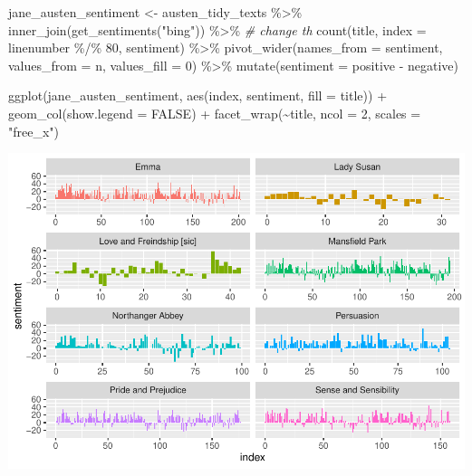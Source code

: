 \documentclass[
]{article}
\newenvironment{Shaded}{\begin{snugshade}}{\end{snugshade}}
\newcommand{\AttributeTok}[1]{\textcolor[rgb]{0.77,0.63,0.00}{#1}}
\newcommand{\CommentTok}[1]{\textcolor[rgb]{0.56,0.35,0.01}{\textit{#1}}}
\newcommand{\ConstantTok}[1]{\textcolor[rgb]{0.00,0.00,0.00}{#1}}
\newcommand{\DecValTok}[1]{\textcolor[rgb]{0.00,0.00,0.81}{#1}}
\newcommand{\FunctionTok}[1]{\textcolor[rgb]{0.00,0.00,0.00}{#1}}
\newcommand{\NormalTok}[1]{#1}
\newcommand{\OtherTok}[1]{\textcolor[rgb]{0.56,0.35,0.01}{#1}}
\newcommand{\SpecialCharTok}[1]{\textcolor[rgb]{0.00,0.00,0.00}{#1}}
\newcommand{\StringTok}[1]{\textcolor[rgb]{0.31,0.60,0.02}{#1}}
\begin{document}
\begin{Shaded}
\begin{Highlighting}[]
\NormalTok{jane\_austen\_sentiment }\OtherTok{\textless{}{-}}\NormalTok{ austen\_tidy\_texts }\SpecialCharTok{\%\textgreater{}\%}
  \FunctionTok{inner\_join}\NormalTok{(}\FunctionTok{get\_sentiments}\NormalTok{(}\StringTok{"bing"}\NormalTok{)) }\SpecialCharTok{\%\textgreater{}\%} \CommentTok{\# change th}
  \FunctionTok{count}\NormalTok{(title, }\AttributeTok{index =}\NormalTok{ linenumber }\SpecialCharTok{\%/\%} \DecValTok{80}\NormalTok{, sentiment) }\SpecialCharTok{\%\textgreater{}\%}
  \FunctionTok{pivot\_wider}\NormalTok{(}\AttributeTok{names\_from =}\NormalTok{ sentiment, }\AttributeTok{values\_from =}\NormalTok{ n, }\AttributeTok{values\_fill =} \DecValTok{0}\NormalTok{) }\SpecialCharTok{\%\textgreater{}\%} 
  \FunctionTok{mutate}\NormalTok{(}\AttributeTok{sentiment =}\NormalTok{ positive }\SpecialCharTok{{-}}\NormalTok{ negative)}

\FunctionTok{ggplot}\NormalTok{(jane\_austen\_sentiment, }\FunctionTok{aes}\NormalTok{(index, sentiment, }\AttributeTok{fill =}\NormalTok{ title)) }\SpecialCharTok{+}
  \FunctionTok{geom\_col}\NormalTok{(}\AttributeTok{show.legend =} \ConstantTok{FALSE}\NormalTok{) }\SpecialCharTok{+}
  \FunctionTok{facet\_wrap}\NormalTok{(}\SpecialCharTok{\textasciitilde{}}\NormalTok{title, }\AttributeTok{ncol =} \DecValTok{2}\NormalTok{, }\AttributeTok{scales =} \StringTok{"free\_x"}\NormalTok{)}
\end{Highlighting}
\end{Shaded}

\includegraphics{Week8_files/figure-latex/unnamed-chunk-8-1.pdf}
\end{document}
